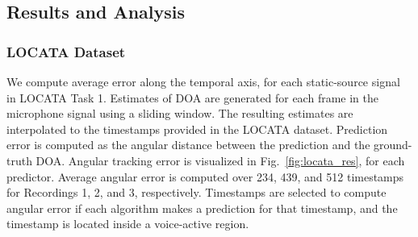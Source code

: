 \documentclass[a4paper]{article}
\begin{document}
\begin{figure*}[htbp]
    \centering
    \vspace{-1.5em}
\caption{Waveforms (top row) and angular tracking error (bottom row) for Recordings 1-3 in LOCATA Task 1. Shaded regions in the waveform indicate voice-active regions, while shaded regions in angular tracking error indicate the intersection of voice activity and regions containing predictions for all models. Each model must wait for a complete input window to make a prediction, hence the regions are not always identical between waveform and tracking error. Cartesian and Categorical models trained on our synthetic dataset achieve consistently lower tracking error compared with the classifier trained by Perotin et al.~\cite{perotin2018crnn} and the MUSIC algorithm~\cite{schmidt1986music}.
}
\vspace{-1.5em}
\label{fig:locata_res}
\end{figure*}





\subsection{Results and Analysis}
\subsubsection{LOCATA Dataset}
We compute average error along the temporal axis, for each static-source signal in LOCATA Task 1. Estimates of DOA are generated for each frame in the microphone signal using a sliding window. The resulting estimates are interpolated to the timestamps provided in the LOCATA dataset. Prediction error is computed as the angular distance between the prediction and the ground-truth DOA. Angular tracking error is visualized in Fig.~\ref{fig:locata_res}, for each predictor. Average angular error is computed over 234, 439, and 512 timestamps for Recordings 1, 2, and 3, respectively. Timestamps are selected to compute angular error if each algorithm makes a prediction for that timestamp, and the timestamp is located inside a voice-active region.
\end{document}
